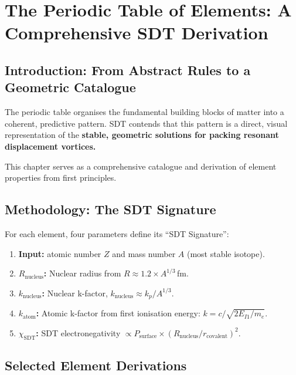\chapter{The Periodic Table of Elements: A Comprehensive SDT Derivation}


\section{Introduction: From Abstract Rules to a Geometric Catalogue}

The periodic table organises the fundamental building blocks of matter into a coherent, predictive pattern.  SDT contends that this pattern is a direct, visual representation of the \textbf{stable, geometric solutions for packing resonant displacement vortices.}

This chapter serves as a comprehensive catalogue and derivation of element properties from first principles.


\section{Methodology: The SDT Signature}

For each element, four parameters define its ``SDT Signature'':

\begin{enumerate}
  \item \textbf{Input:} atomic number $Z$ and mass number $A$ (most stable isotope).
  \item \textbf{$R_{\text{nucleus}}$:} Nuclear radius from $R \approx 1.2 \times A^{1/3}$\,fm.
  \item \textbf{$k_{\text{nucleus}}$:} Nuclear k-factor, $k_{\text{nucleus}} \approx k_p / A^{1/3}$.
  \item \textbf{$k_{\text{atom}}$:} Atomic k-factor from first ionisation energy: $k = c/\sqrt{2 E_{I1}/m_e}$.
  \item \textbf{$\chi_{\text{SDT}}$:} SDT electronegativity $\propto P_{\text{surface}} \times (R_{\text{nucleus}}/r_{\text{covalent}})^2$.
\end{enumerate}


\section{Selected Element Derivations}

